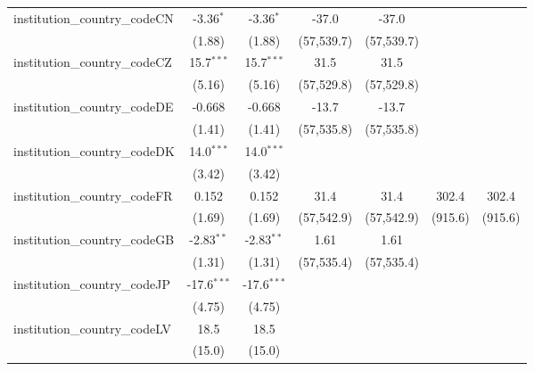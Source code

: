\begin{tabular}{lcccccc}
   institution\_country\_codeCN          & -3.36$^{*}$   & -3.36$^{*}$   & -37.0        & -37.0        &               &   \\   
                                         & (1.88)        & (1.88)        & (57,539.7)   & (57,539.7)   &               &   \\   
   institution\_country\_codeCZ          & 15.7$^{***}$  & 15.7$^{***}$  & 31.5         & 31.5         &               &   \\   
                                         & (5.16)        & (5.16)        & (57,529.8)   & (57,529.8)   &               &   \\   
   institution\_country\_codeDE          & -0.668        & -0.668        & -13.7        & -13.7        &               &   \\   
                                         & (1.41)        & (1.41)        & (57,535.8)   & (57,535.8)   &               &   \\   
   institution\_country\_codeDK          & 14.0$^{***}$  & 14.0$^{***}$  &              &              &               &   \\   
                                         & (3.42)        & (3.42)        &              &              &               &   \\   
   institution\_country\_codeFR          & 0.152         & 0.152         & 31.4         & 31.4         & 302.4         & 302.4\\   
                                         & (1.69)        & (1.69)        & (57,542.9)   & (57,542.9)   & (915.6)       & (915.6)\\   
   institution\_country\_codeGB          & -2.83$^{**}$  & -2.83$^{**}$  & 1.61         & 1.61         &               &   \\   
                                         & (1.31)        & (1.31)        & (57,535.4)   & (57,535.4)   &               &   \\   
   institution\_country\_codeJP          & -17.6$^{***}$ & -17.6$^{***}$ &              &              &               &   \\   
                                         & (4.75)        & (4.75)        &              &              &               &   \\   
   institution\_country\_codeLV          & 18.5          & 18.5          &              &              &               &   \\   
                                         & (15.0)        & (15.0)        &              &              &               &   \\   

\end{tabular}
